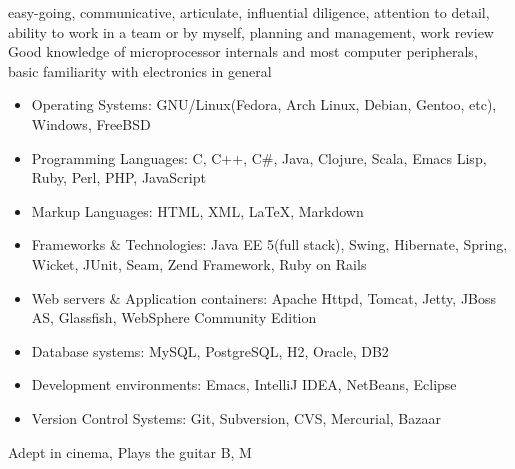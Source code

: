 \ecvlanguageheader{(*)}
\ecvlanguagefooter{(*)}
\ecvitem{}{}
\ecvitem{}{}
{
  easy-going, communicative, articulate, influential  
}
{
  diligence, attention to detail, ability to work in a team or by
  myself, planning and management, work review
}
{
  Good knowledge of microprocessor internals and most computer
  peripherals, basic familiarity with electronics in general
}
{
  \begin{itemize}
  \item Operating Systems: GNU/Linux(Fedora, Arch Linux, Debian,
    Gentoo, etc), Windows, FreeBSD
  \item Programming Languages: C, C++, C\#, Java, Clojure, Scala,
    Emacs Lisp, Ruby, Perl, PHP, JavaScript
  \item Markup Languages: HTML, XML, \LaTeX, Markdown
  \item Frameworks \& Technologies: Java EE 5(full stack), Swing, Hibernate,
    Spring, Wicket, JUnit, Seam, Zend Framework, Ruby on Rails
  \item Web servers \& Application containers: Apache Httpd, Tomcat,
    Jetty, JBoss AS, Glassfish, WebSphere Community Edition
  \item Database systems: MySQL, PostgreSQL, H2, Oracle, DB2
  \item Development environments: Emacs, IntelliJ IDEA, NetBeans, Eclipse 
  \item Version Control Systems: Git, Subversion, CVS, Mercurial,
    Bazaar
  \end{itemize}
}
{
  Adept in cinema, Plays the guitar
}
{}
{B, M}

\ecvitem{}{}
\ecvitem{}{}

